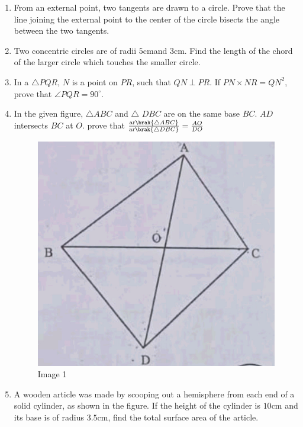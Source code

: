 \begin{enumerate}
\item
From an external point, two tangents are drawn to a circle. Prove that the line joining the external point to the center of the circle bisects the angle between the two tangents.
\item
	Two concentric circles are of radii $5\mathrm{cm}$and $3\mathrm{cm}$. Find the length of the chord of the larger circle which touches the smaller circle.
\item
In a $\triangle{PQR}$, $N$ is a point on $PR$, such that $QN$$\perp$$PR$. If $PN \times NR=QN^2$, prove that $\angle{PQR}=90^{\circ}$.
\newpage
\item
In the given figure, $\triangle ABC$  and  $\triangle$ $DBC$  are on the same base $BC$.  $AD$ intersects $BC$ at $O$.
prove that  $\frac{\text{ar}\brak{\triangle ABC}}{\text{ar}\brak{\triangle DBC}} = \frac{AO}{DO}$
\begin{figure}[h!]
\centering
\includegraphics[width=\columnwidth]{figs/img1.jpg}
\caption{Image 1}
\end{figure} 
\newpage
\item
	A wooden article was made by scooping out a hemisphere from each end of a solid cylinder, as shown in the figure. If the height of the cylinder is $10\mathrm{cm}$ and its base is of radius $3.5\mathrm{cm}$, find the total surface area of the article.
\begin{figure}[h!]
\centering

\end{figure}
\end{enumerate}
